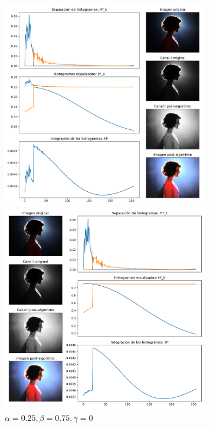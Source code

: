 \begin{figure}[H]
\begin{minipage}[c]{0.48\linewidth}
  \includegraphics[height=9cm]{imgs/wom-75-25-0.pdf}
  \caption{$\alpha = 0.75, \beta = 0.25, \gamma = 0$}
\end{minipage}
\hfill
\begin{minipage}[c]{0.48\linewidth}
  \includegraphics[height=9cm]{imgs/wom-25-75-0.pdf}
  \caption{$\alpha = 0.25, \beta = 0.75, \gamma = 0$}
\end{minipage}%
\end{figure}

